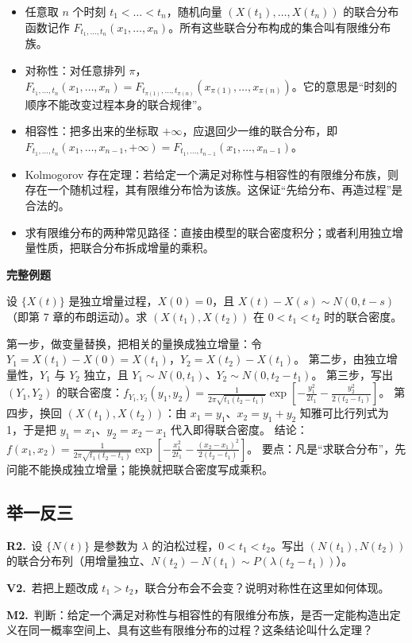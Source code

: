 \documentclass[UTF8,a4paper,11pt]{ctexart}
\newcommand{\PracticeQuestion}[3]{\par\Needspace{4\baselineskip}\noindent\begin{minipage}{\linewidth}\textbf{#1.}\ #2\par\noindent\rule{0pt}{#3mm}\par\end{minipage}\par}
\begin{document}
\begin{itemize}
\item 任意取 $n$ 个时刻 $t_1<\dots<t_n$，随机向量 $(X(t_1),\dots,X(t_n))$ 的联合分布函数记作 $F_{t_1,\dots,t_n}(x_1,\dots,x_n)$。所有这些联合分布构成的集合叫有限维分布族。
\item 对称性：对任意排列 $\pi$，$F_{t_1,\dots,t_n}(x_1,\dots,x_n)=F_{t_{\pi(1)},\dots,t_{\pi(n)}}(x_{\pi(1)},\dots,x_{\pi(n)})$。它的意思是“时刻的顺序不能改变过程本身的联合规律”。
\item 相容性：把多出来的坐标取 $+\infty$，应退回少一维的联合分布，即 $F_{t_1,\dots,t_n}(x_1,\dots,x_{n-1},+\infty)=F_{t_1,\dots,t_{n-1}}(x_1,\dots,x_{n-1})$。
\item Kolmogorov 存在定理：若给定一个满足对称性与相容性的有限维分布族，则存在一个随机过程，其有限维分布恰为该族。这保证“先给分布、再造过程”是合法的。
\item 求有限维分布的两种常见路径：直接由模型的联合密度积分；或者利用独立增量性质，把联合分布拆成增量的乘积。
\end{itemize}
\textbf{完整例题}

设 $\{X(t)\}$ 是独立增量过程，$X(0)=0$，且 $X(t)-X(s)\sim N(0,t-s)$（即第 7 章的布朗运动）。求 $(X(t_1),X(t_2))$ 在 $0<t_1<t_2$ 时的联合密度。

第一步，做变量替换，把相关的量换成独立增量：令 $Y_1=X(t_1)-X(0)=X(t_1)$，$Y_2=X(t_2)-X(t_1)$。 第二步，由独立增量性，$Y_1$ 与 $Y_2$ 独立，且 $Y_1\sim N(0,t_1)$、$Y_2\sim N(0,t_2-t_1)$。 第三步，写出 $(Y_1,Y_2)$ 的联合密度：$f_{Y_1,Y_2}(y_1,y_2)=\frac{1}{2\pi\sqrt{t_1(t_2-t_1)}}\exp\left[-\frac{y_1^2}{2t_1}-\frac{y_2^2}{2(t_2-t_1)}\right]$。 第四步，换回 $(X(t_1),X(t_2))$：由 $x_1=y_1$、$x_2=y_1+y_2$ 知雅可比行列式为 1，于是把 $y_1=x_1$、$y_2=x_2-x_1$ 代入即得联合密度。 结论：$f(x_1,x_2)=\frac{1}{2\pi\sqrt{t_1(t_2-t_1)}}\exp\left[-\frac{x_1^2}{2t_1}-\frac{(x_2-x_1)^2}{2(t_2-t_1)}\right]$。 要点：凡是“求联合分布”，先问能不能换成独立增量；能换就把联合密度写成乘积。

\subsection{举一反三}
\PracticeQuestion{R2}{设 $\{N(t)\}$ 是参数为 $\lambda$ 的泊松过程，$0<t_1<t_2$。写出 $(N(t_1),N(t_2))$ 的联合分布列（用增量独立、$N(t_2)-N(t_1)\sim P(\lambda(t_2-t_1))$）。}{38}
\PracticeQuestion{V2}{若把上题改成 $t_1>t_2$，联合分布会不会变？说明对称性在这里如何体现。}{42}
\PracticeQuestion{M2}{判断：给定一个满足对称性与相容性的有限维分布族，是否一定能构造出定义在同一概率空间上、具有这些有限维分布的过程？这条结论叫什么定理？}{34}
\clearpage
{}
\end{document}
